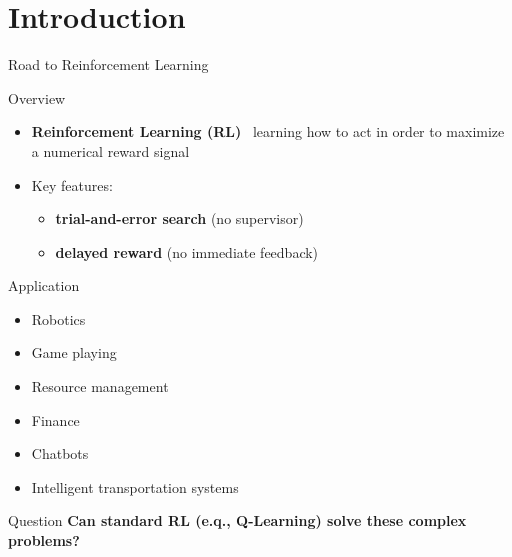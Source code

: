 \documentclass[presentation, 9pt]{beamer}\mode<presentation>{\usetheme{AMSBolognaFC}}
\begin{document}
\section{Introduction}
\begin{frame}{Road to  Reinforcement Learning}
	\begin{block}{Overview}
		\begin{itemize}
		\item \textbf{Reinforcement Learning (RL)} \faArrowRight \, learning how to act in order to maximize a numerical reward signal
		\item Key features:
		\begin{itemize}
			\item \textbf{trial-and-error search} (no supervisor)
			\item \textbf{delayed reward} (no immediate feedback)
		\end{itemize}
	\end{itemize}
	\end{block}
	\begin{block}{Application}
		\begin{multicols}{2}
		\begin{itemize}
			\item Robotics
			\item Game playing
			\item Resource management
			\item Finance
			\item Chatbots
			\item Intelligent transportation systems
		\end{itemize}
		\end{multicols}
	\end{block}

	\begin{alertblock}{Question}
		\centering
		\textbf{Can standard RL (e.q., Q-Learning) solve these complex problems?}		
	\end{alertblock}
\end{frame}
\end{document}
